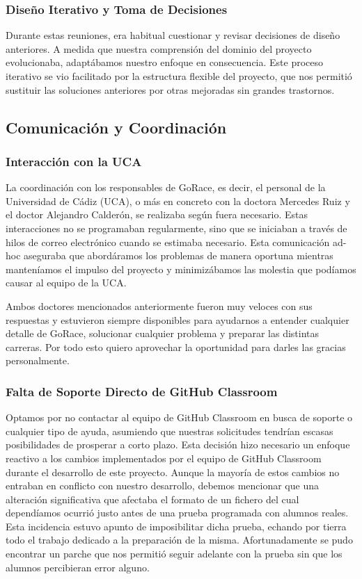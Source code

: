 \subsubsection{Diseño Iterativo y Toma de Decisiones}
Durante estas reuniones, era habitual cuestionar y revisar decisiones de diseño anteriores. A medida que nuestra comprensión del dominio del proyecto evolucionaba, adaptábamos nuestro enfoque en consecuencia. Este proceso iterativo se vio facilitado por la estructura flexible del proyecto, que nos permitió sustituir las soluciones anteriores por otras mejoradas sin grandes trastornos.

\subsection{Comunicación y Coordinación}

\subsubsection{Interacción con la UCA}
La coordinación con los responsables de GoRace, es decir, el personal de la Universidad de Cádiz (\acrshort{UCA}), o más en concreto con la doctora Mercedes Ruiz y el doctor Alejandro Calderón, se realizaba según fuera necesario. Estas interacciones no se programaban regularmente, sino que se iniciaban a través de hilos de correo electrónico cuando se estimaba necesario. Esta comunicación ad-hoc aseguraba que abordáramos los problemas de manera oportuna mientras manteníamos el impulso del proyecto y minimizábamos las molestia que podíamos causar al equipo de la UCA.

Ambos doctores mencionados anteriormente fueron muy veloces con sus respuestas y estuvieron siempre disponibles para ayudarnos a entender cualquier detalle de GoRace, solucionar cualquier problema y preparar las distintas carreras. Por todo esto quiero aprovechar la oportunidad para darles las gracias personalmente.

\subsubsection{Falta de Soporte Directo de GitHub Classroom}
Optamos por no contactar al equipo de GitHub Classroom en busca de soporte o cualquier tipo de ayuda, asumiendo que nuestras solicitudes tendrían escasas posibilidades de prosperar a corto plazo. Esta decisión hizo necesario un enfoque reactivo a los cambios implementados por el equipo de GitHub Classroom durante el desarrollo de este proyecto. Aunque la mayoría de estos cambios no entraban en conflicto con nuestro desarrollo, debemos mencionar que una alteración significativa que afectaba el formato de un fichero del cual dependíamos ocurrió justo antes de una prueba programada con alumnos reales. Esta incidencia estuvo apunto de imposibilitar dicha prueba, echando por tierra todo el trabajo dedicado a la preparación de la misma. Afortunadamente se pudo encontrar un parche que nos permitió seguir adelante con la prueba sin que los alumnos percibieran error alguno.

